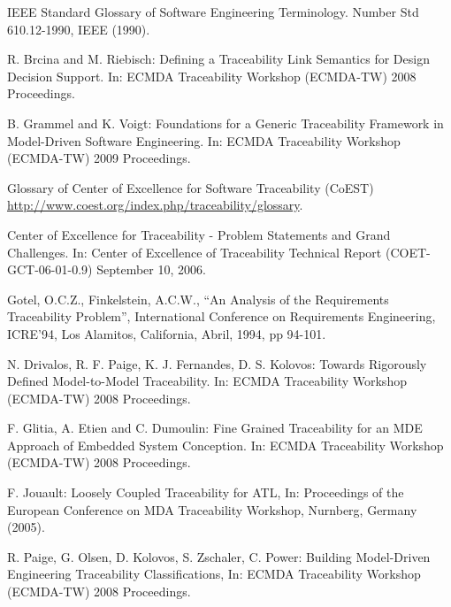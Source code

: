 \documentclass[a4paper,12pt,oneside,spanish]{book}
\begin{document}

\printglossaries




\clearpage
{}

\begin{thebibliography}{99}


 IEEE Standard Glossary of Software Engineering Terminology. Number Std 610.12-1990, IEEE (1990).

 R. Brcina and M. Riebisch: Defining a Traceability Link Semantics for Design Decision Support. In: ECMDA Traceability Workshop (ECMDA-TW) 2008 Proceedings.

 B. Grammel and K. Voigt: Foundations for a Generic Traceability Framework in Model-Driven Software Engineering. In: ECMDA Traceability Workshop (ECMDA-TW) 2009 Proceedings.

 Glossary of Center of Excellence for Software Traceability (CoEST) \url{http://www.coest.org/index.php/traceability/glossary}.

 Center of Excellence for Traceability - Problem Statements and Grand Challenges. In: Center of Excellence of Traceability Technical Report (COET-GCT-06-01-0.9) September 10, 2006.

 Gotel, O.C.Z., Finkelstein, A.C.W., “An Analysis of the Requirements Traceability Problem”, International Conference on Requirements Engineering, ICRE’94, Los Alamitos, California, Abril, 1994, pp 94-101.

 N. Drivalos, R. F. Paige, K. J. Fernandes, D. S. Kolovos: Towards Rigorously Defined Model-to-Model Traceability. In: ECMDA Traceability Workshop (ECMDA-TW) 2008 Proceedings.

 F. Glitia, A. Etien and C. Dumoulin: Fine Grained Traceability for an MDE Approach of Embedded System Conception. In: ECMDA Traceability Workshop (ECMDA-TW) 2008 Proceedings.

 F. Jouault: Loosely Coupled Traceability for ATL, In: Proceedings of the European Conference on MDA Traceability Workshop, Nurnberg, Germany (2005).

 R. Paige, G. Olsen, D. Kolovos, S. Zschaler, C. Power: Building Model-Driven Engineering Traceability Classifications, In: ECMDA Traceability Workshop (ECMDA-TW) 2008 Proceedings.


\end{thebibliography}
\end{document}

